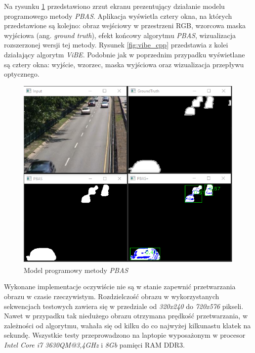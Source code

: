 Na rysunku \ref{fig:pbas_cpp} przedstawiono zrzut ekranu prezentujący działanie modelu programowego metody \textit{PBAS}. 
Aplikacja wyświetla cztery okna, na których przedstawione są kolejno: obraz wejściowy w przestrzeni RGB, wzorcowa maska wyjściowa (ang. \textit{ground truth}), efekt końcowy algorytmu \textit{PBAS}, wizualizacja rozszerzonej wersji tej metody. 
Rysunek \ref{fig:vibe_cpp} przedstawia z kolei działający algorytm \textit{ViBE}. 
Podobnie jak w poprzednim przypadku wyświetlane są cztery okna: wyjście, wzorzec, maska wyjściowa oraz wizualizacja przepływu optycznego.

    \begin{figure}[h!]
        \centering
        \includegraphics[scale=0.55]{img/4/pbas_module_cpp.png}
        \caption{Model programowy metody \textit{PBAS}}
	    \label{fig:pbas_cpp}
    \end{figure}

Wykonane implementacje oczywiście nie są w stanie zapewnić przetwarzania obrazu w czasie rzeczywistym. 
Rozdzielczość obrazu w wykorzystanych sekwencjach testowych zawiera się w przedziale od \textit{320x240} do \textit{720x576} pikseli. 
Nawet w przypadku tak niedużego obrazu otrzymana prędkość przetwarzania, w zależności od algorytmu, wahała się od kilku do co najwyżej kilkunastu klatek na sekundę. 
Wszystkie testy przeprowadzono na laptopie wyposażonym w procesor \textit{Intel Core i7 3630QM@3,4GHz} i \textit{8Gb} pamięci RAM DDR3. 

